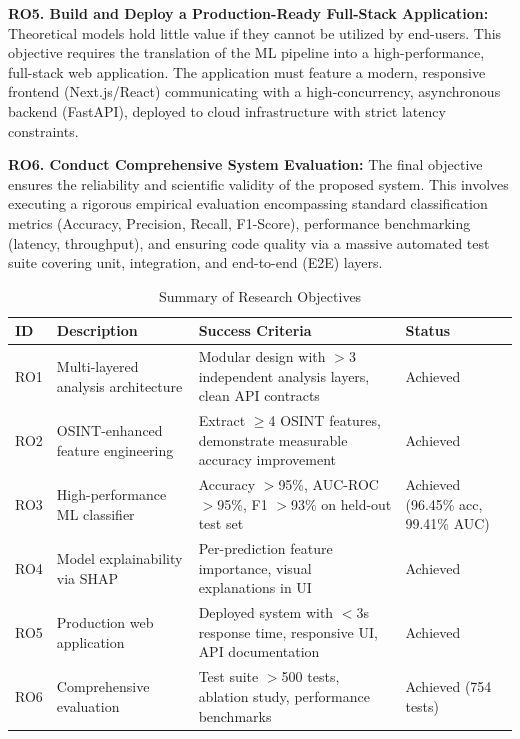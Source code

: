\textbf{RO5. Build and Deploy a Production-Ready Full-Stack
Application:} Theoretical models hold little value if they cannot be
utilized by end-users. This objective requires the translation of the ML
pipeline into a high-performance, full-stack web application. The
application must feature a modern, responsive frontend (Next.js/React)
communicating with a high-concurrency, asynchronous backend (FastAPI),
deployed to cloud infrastructure with strict latency constraints.

\textbf{RO6. Conduct Comprehensive System Evaluation:} The final
objective ensures the reliability and scientific validity of the
proposed system. This involves executing a rigorous empirical evaluation
encompassing standard classification metrics (Accuracy, Precision,
Recall, F1-Score), performance benchmarking (latency, throughput), and
ensuring code quality via a massive automated test suite covering unit,
integration, and end-to-end (E2E) layers.

\setlength{\tabcolsep}{4pt}
\small
\begin{longtable}{
>{\raggedright\arraybackslash}p{}
>{\raggedright\arraybackslash}p{}
>{\raggedright\arraybackslash}p{}
>{\raggedright\arraybackslash}p{}}
\caption{Summary of Research Objectives} \\
\toprule
ID & Description & Success Criteria & Status \\
\midrule

RO1 & Multi-layered analysis architecture & Modular design with
$>$3 independent analysis layers, clean API contracts &
Achieved \\
RO2 & OSINT-enhanced feature engineering & Extract $\geq$4 OSINT
features, demonstrate measurable accuracy improvement & Achieved \\
RO3 & High-performance ML classifier & Accuracy $>$95\%,
AUC-ROC $>$95\%, F1 $>$93\% on held-out test set &
Achieved (96.45\% acc, 99.41\% AUC) \\
RO4 & Model explainability via SHAP & Per-prediction feature importance,
visual explanations in UI & Achieved \\
RO5 & Production web application & Deployed system with $<$3s
response time, responsive UI, API documentation & Achieved \\
RO6 & Comprehensive evaluation & Test suite $>$500 tests,
ablation study, performance benchmarks & Achieved (754 tests) \\

\bottomrule
\end{longtable}
\normalsize
\setlength{\tabcolsep}{6pt}

